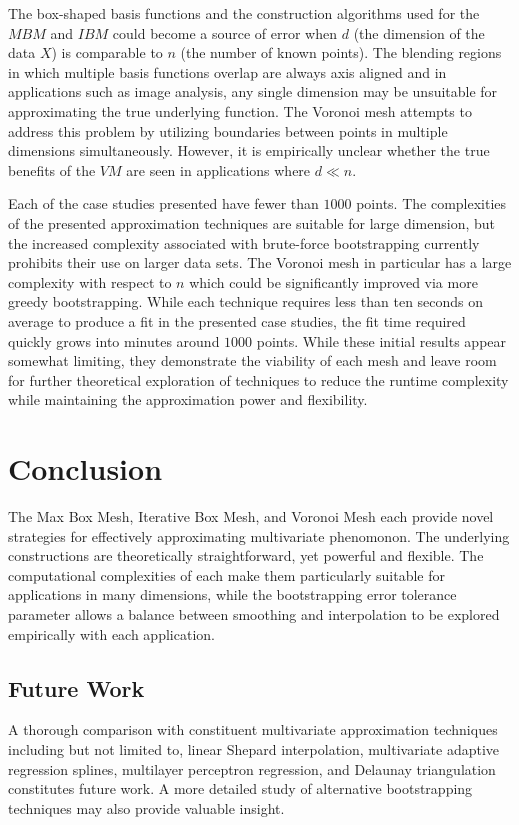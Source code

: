 The box-shaped basis functions and the construction algorithms used for the $MBM$ and $IBM$ could become a source of error when $d$ (the dimension of the data $X$) is comparable to $n$ (the number of known points). The blending regions in which multiple basis functions overlap are always axis aligned and in applications such as image analysis, any single dimension may be unsuitable for approximating the true underlying function. The Voronoi mesh attempts to address this problem by utilizing boundaries between points in multiple dimensions simultaneously. However, it is empirically unclear whether the true benefits of the $VM$ are seen in applications where $d \ll n$.

Each of the case studies presented have fewer than $1000$ points. The complexities of the presented approximation techniques are suitable for large dimension, but the increased complexity associated with brute-force bootstrapping currently prohibits their use on larger data sets. The Voronoi mesh in particular has a large complexity with respect to $n$ which could be significantly improved via more greedy bootstrapping. While each technique requires less than ten seconds on average to produce a fit in the presented case studies, the fit time required quickly grows into minutes around $1000$ points. While these initial results appear somewhat limiting, they demonstrate the viability of each mesh and leave room for further theoretical exploration of techniques to reduce the runtime complexity while maintaining the approximation power and flexibility.

\section{Conclusion}

The Max Box Mesh, Iterative Box Mesh, and Voronoi Mesh each provide novel strategies for effectively approximating multivariate phenomonon. The underlying constructions are theoretically straightforward, yet powerful and flexible. The computational complexities of each make them particularly suitable for applications in many dimensions, while the bootstrapping error tolerance parameter allows a balance between smoothing and interpolation to be explored empirically with each application.

\subsection{Future Work}

A thorough comparison with constituent multivariate approximation techniques including but not limited to, linear Shepard interpolation, multivariate adaptive regression splines, multilayer perceptron regression, and Delaunay triangulation constitutes future work. A more detailed study of alternative bootstrapping techniques may also provide valuable insight.






